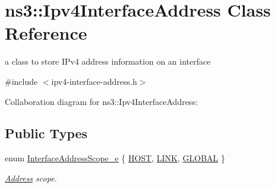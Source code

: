 \hypertarget{classns3_1_1Ipv4InterfaceAddress}{}\section{ns3\+:\+:Ipv4\+Interface\+Address Class Reference}
\label{classns3_1_1Ipv4InterfaceAddress}


a class to store I\+Pv4 address information on an interface  




{\ttfamily \#include $<$ipv4-\/interface-\/address.\+h$>$}



Collaboration diagram for ns3\+:\+:Ipv4\+Interface\+Address\+:
\subsection*{Public Types}
\begin{DoxyCompactItemize}
\item 
enum \hyperlink{classns3_1_1Ipv4InterfaceAddress_a329cea433e74f717c26c9e51c4fcd3d8}{Interface\+Address\+Scope\+\_\+e} \{ \hyperlink{classns3_1_1Ipv4InterfaceAddress_a329cea433e74f717c26c9e51c4fcd3d8a7276e171c0232cceba24502099750890}{H\+O\+ST}, 
\hyperlink{classns3_1_1Ipv4InterfaceAddress_a329cea433e74f717c26c9e51c4fcd3d8a0608c8dc6260f682341cb3a1629237ec}{L\+I\+NK}, 
\hyperlink{classns3_1_1Ipv4InterfaceAddress_a329cea433e74f717c26c9e51c4fcd3d8ae144856017bcfb529872c91204d462b2}{G\+L\+O\+B\+AL}
 \}\begin{DoxyCompactList}\small\item\em \hyperlink{classns3_1_1Address}{Address} scope. \end{DoxyCompactList}
\end{DoxyCompactItemize}
